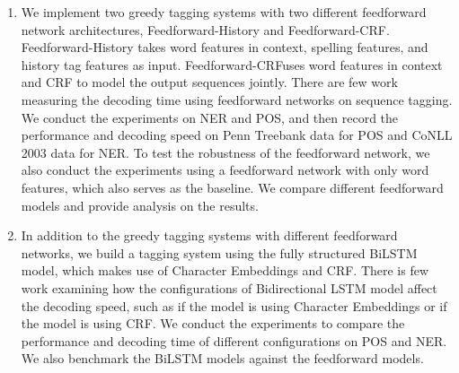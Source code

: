 \documentclass{sfuthesis}
\newcommand{\ffa}{Feedforward-History}
\newcommand{\ffb}{Feedforward-CRF}
\begin{document}
\begin{enumerate}

\item We implement two greedy tagging systems with two different feedforward network architectures, \ffa{} and \ffb. \ffa{} takes word features in context, spelling features, and history tag features as input. \ffb uses word features in context and CRF to model the output sequences jointly. There are few work measuring the decoding time using feedforward networks on sequence tagging. We conduct the experiments on NER and POS, and then record the performance and decoding speed on Penn Treebank data for POS and CoNLL 2003 data for NER. To test the robustness of the feedforward network, we also conduct the experiments using a feedforward network with only word features, which also serves as the baseline. We compare different feedforward models and provide analysis on the results. 

\item In addition to the greedy tagging systems with different feedforward networks, we build a tagging system using the fully structured BiLSTM model, which makes use of Character Embeddings and CRF. There is few work examining how the configurations of Bidirectional LSTM model affect the decoding speed, such as if the model is using Character Embeddings or if the model is using CRF. We conduct the experiments to compare the performance and decoding time of different configurations on POS and NER. We also benchmark the BiLSTM models against the feedforward models.


\end{enumerate}
\end{document}
